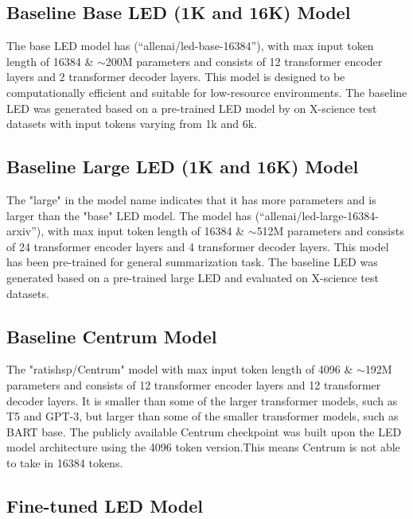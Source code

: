 \documentclass[12pt, twocolumn]{article}
\numberwithin{equation}{section}
\begin{document}
\subsection{Baseline Base LED (1K and 16K) Model}
\label{app:model-base-led}

The base LED model has (“allenai/led-base-16384”), with max input token length of 16384 \& $\sim$200M parameters and consists of 12 transformer encoder layers and 2 transformer decoder layers. This model is designed to be computationally efficient and suitable for low-resource environments. The baseline LED was generated based on a pre-trained LED model by \cite{beltagy2020longformer} on X-science test datasets with input tokens varying from 1k and 6k.

\subsection{Baseline Large LED (1K and 16K) Model}
\label{app:model-large-led}

The "large" in the model name indicates that it has more parameters and is larger than the "base" LED model. The model has (“allenai/led-large-16384-arxiv”), with max input token length of 16384 \& $\sim$512M parameters and consists of 24 transformer encoder layers and 4 transformer decoder layers. This model has been pre-trained for general summarization task. The baseline LED was generated based on a pre-trained large LED and evaluated on X-science test datasets.

\subsection{Baseline Centrum Model}
\label{app:model-centrum}

The "ratishsp/Centrum" model with max input token length of 4096 \& $\sim$192M parameters and consists of 12 transformer encoder layers and 12 transformer decoder layers. It is smaller than some of the larger transformer models, such as T5 and GPT-3, but larger than some of the smaller transformer models, such as BART base. The publicly available Centrum checkpoint was built upon the LED model architecture using the 4096 token version.This means Centrum is not able to take in 16384 tokens.

\subsection{Fine-tuned LED Model}
\label{app:model-ft-led}
\end{document}
